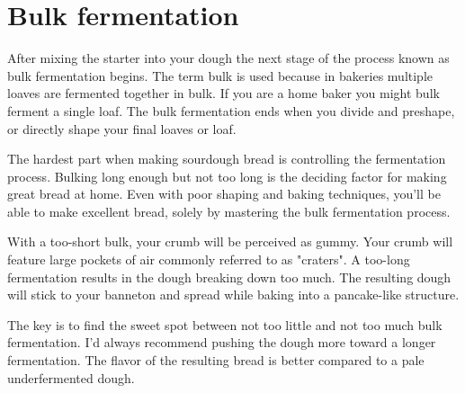 \section{Bulk fermentation}

After mixing the starter into your dough the next stage of
the process known as bulk fermentation begins. The term
bulk is used because in bakeries multiple loaves are fermented
together in bulk. If you are a home baker you might bulk
ferment a single loaf. The bulk fermentation ends when you
divide and preshape, or directly shape your final loaves or loaf.

The hardest part when making sourdough bread is controlling
the fermentation process. Bulking long enough but not too
long is the deciding factor for making great bread at home.
Even with poor shaping and baking techniques, you'll be able
to make excellent bread, solely by mastering the bulk
fermentation process.

With a too-short bulk, your crumb will be
perceived as gummy. Your crumb will feature large pockets of
air commonly referred to as "craters". A too-long fermentation
results in the dough breaking down too much. The resulting
dough will stick to your banneton and spread while baking
into a pancake-like structure.

The key is to find the sweet spot between not too little
and not too much bulk fermentation. I'd always recommend pushing
the dough more toward a longer fermentation. The
flavor of the resulting bread is better compared to a pale
underfermented dough.

